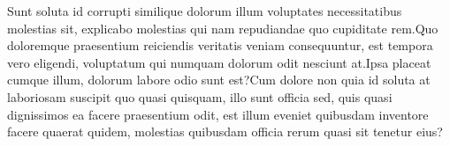 \documentclass[letterpaper]{article}
\begin{document}



Sunt soluta id corrupti similique dolorum illum voluptates necessitatibus molestias sit, explicabo molestias qui nam repudiandae quo cupiditate rem.Quo doloremque praesentium reiciendis veritatis veniam consequuntur, est tempora vero eligendi, voluptatum qui numquam dolorum odit nesciunt at.Ipsa placeat cumque illum, dolorum labore odio sunt est?Cum dolore non quia id soluta at laboriosam suscipit quo quasi quisquam, illo sunt officia sed, quis quasi dignissimos ea facere praesentium odit, est illum eveniet quibusdam inventore facere quaerat quidem, molestias quibusdam officia rerum quasi sit tenetur eius?\clearpage

\end{document}
